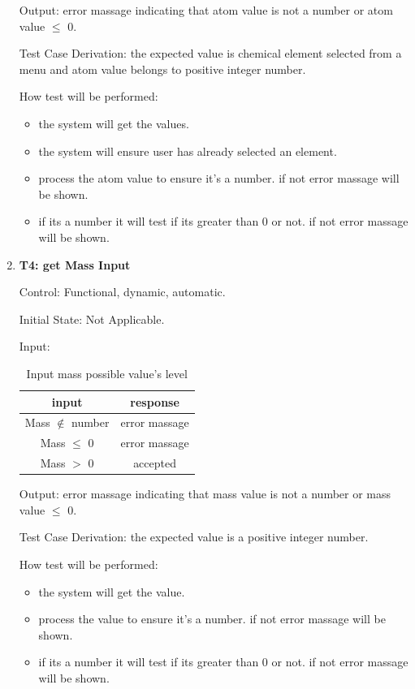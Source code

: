 \documentclass[12pt, titlepage]{article}
\begin{document}
\begin{enumerate}
Output: error massage indicating that atom value is not a number or atom value $\leq$ 0. 

Test Case Derivation: the expected value is chemical element selected from a menu and atom value belongs to positive integer number. 

How test will be performed: 
\begin{itemize}
\item the system will get the values. 
\item the system will ensure user has already selected an element. 
\item process the atom value to ensure it's a number. if not error massage will be shown.
\item if its a number it will test if its greater than 0 or not.  if not error massage will be shown.
\end{itemize}

\item{\bf T4: get Mass Input \\}

Control: Functional, dynamic, automatic.
					
Initial State: Not Applicable.
					
Input: 
\begin{table}[h!]
\centering
\begin{tabular}{|c|c|}
\hline
input & response  \\
\hline
Mass $\notin$ number  & error massage \\ \hline
Mass $\leq$ 0& error massage \\ \hline
Mass $>$ 0  & accepted\\ \hline
\hline
\end{tabular}
\caption{Input mass possible value's level }
\label{mass}
\end{table}

Output: error massage indicating that mass value is not a number or mass value $\leq$ 0. 

Test Case Derivation: the expected value is a positive integer number. 
					
How test will be performed: 
\begin{itemize}
\item the system will get the value. 
\item process the value to ensure it's a number. if not error massage will be shown.
\item if its a number it will test if its greater than 0 or not.  if not error massage will be shown.
\end{itemize}


\end{enumerate}
\end{document}
